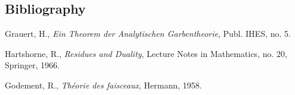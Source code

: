 \documentclass[11pt]{article}
\begin{document}
\subsection*{Bibliography}
\begin{enumerate}[label={[\arabic*]}]
\item Grauert, H., \emph{Ein Theorem der Analytischen Garbentheorie}, Publ. IHES, no. 5.
\item Hartshorne, R., \emph{Residues and Duality}, Lecture Notes in Mathematics, no. 20, Springer, 1966.
\item Godement, R., \emph{Théorie des faisceaux}, Hermann, 1958.
\end{enumerate}
\end{document}
